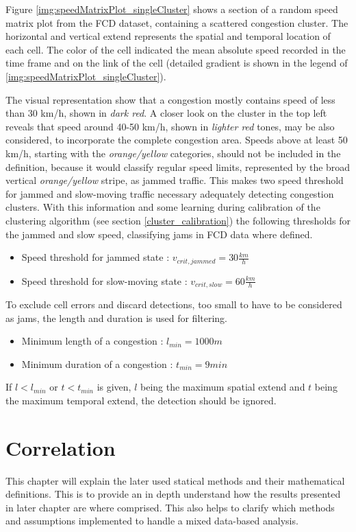 \documentclass[a4paper,12pt]{report}
\begin{document}
Figure \ref{img:speedMatrixPlot_singleCluster} shows a section of a random speed matrix plot from the FCD dataset, containing a scattered congestion cluster. The horizontal and vertical extend represents the spatial and temporal location of each cell. The color of the cell indicated the mean absolute speed recorded in the time frame and on the link of the cell (detailed gradient is shown in the legend of \ref{img:speedMatrixPlot_singleCluster}).

The visual representation show that a congestion mostly contains speed of less than 30 km/h, shown in \textit{dark red}. A closer look on the cluster in the top left reveals that speed around 40-50 km/h, shown in \textit{lighter red} tones, may be also considered, to incorporate the complete congestion area. Speeds above at least 50 km/h, starting with the \textit{orange/yellow} categories, should not be included in the definition, because it would classify regular speed limits, represented by the broad vertical \textit{orange/yellow} stripe, as jammed traffic. This makes two speed threshold for jammed and slow-moving traffic necessary adequately detecting congestion clusters. With this information and some learning during calibration of the clustering algorithm (see section \ref{cluster_calibration}) the following thresholds for the jammed and slow speed, classifying \glspl{jam} in FCD data where defined.

\begin{itemize}
	\item Speed threshold for jammed state : $v_{crit,jammed} = 30 \frac{km}{h}$
	\item Speed threshold for slow-moving state : $v_{crit,slow} = 60 \frac{km}{h}$
\end{itemize}

To exclude cell errors and discard detections, too small to have to be considered as jams, the length and duration is used for filtering. 

\begin{itemize}
	\item Minimum length of a congestion : $l_{min} = 1000 m$
	\item Minimum duration of a congestion : $t_{min} = 9 min$
\end{itemize}

If $l < l_{min}$ or $t < t_{min}$ is given, $l$ being the maximum spatial extend and $t$ being the maximum temporal extend, the detection should be ignored.

\chapter{Correlation}
\label{definition_correlation}
This chapter will explain the later used statical methods and their mathematical definitions. This is to provide an in depth understand how the results presented in later chapter are where comprised. This also helps to clarify which methods and assumptions implemented to handle a mixed data-based analysis.
\end{document}
